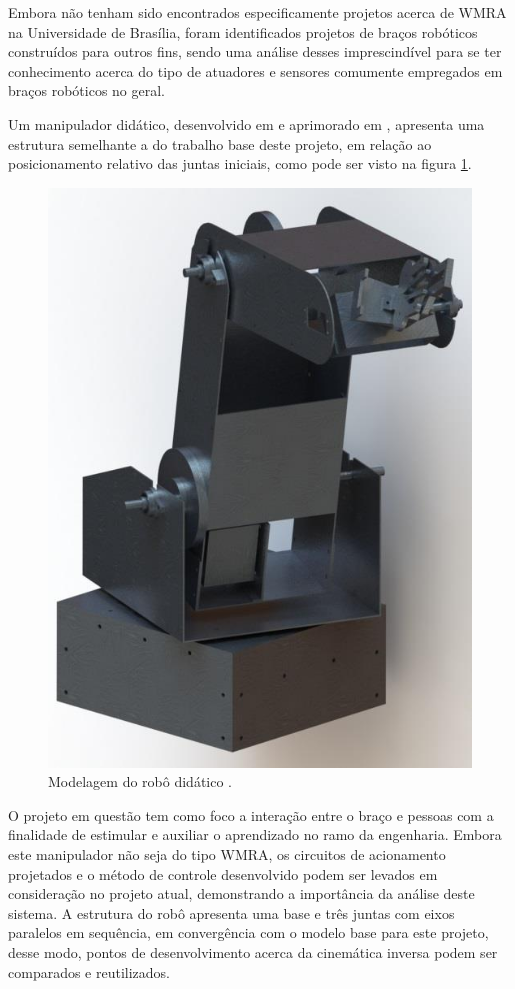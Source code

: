 Embora não tenham sido encontrados especificamente projetos acerca de WMRA na Universidade de Brasília, foram identificados projetos de braços robóticos
construídos para outros fins, sendo uma análise desses imprescindível para se ter conhecimento acerca do tipo de atuadores e sensores comumente empregados em 
braços robóticos no geral.

Um manipulador didático, desenvolvido em \cite{wattylas2015didatico} e aprimorado em \cite{marconi2016didatico}, apresenta uma estrutura semelhante a do trabalho base
deste projeto, em relação ao posicionamento relativo das juntas iniciais, como pode ser visto na figura \ref{fig:manipulador-didatico}.

\begin{figure}[ht]
\caption{Modelagem do robô didático \cite{wattylas2015didatico}.}    
\begin{centering}
\includegraphics[width=0.5\columnwidth]{images/fundamentos/manipulador-didatico.png}
\par\end{centering}

\label{fig:manipulador-didatico}
\end{figure}

O projeto em questão tem como foco a interação entre o braço e pessoas com a finalidade de estimular e auxiliar o aprendizado no ramo da engenharia.
Embora este manipulador não seja do tipo WMRA, os circuitos de 
acionamento projetados e o método de controle desenvolvido podem ser 
levados em consideração no projeto atual, demonstrando a importância da
análise deste sistema.
A estrutura do robô apresenta uma base e três juntas com eixos paralelos
em sequência, em convergência com o modelo base para este projeto, desse modo,
pontos de desenvolvimento acerca da cinemática inversa podem ser comparados
e reutilizados.


